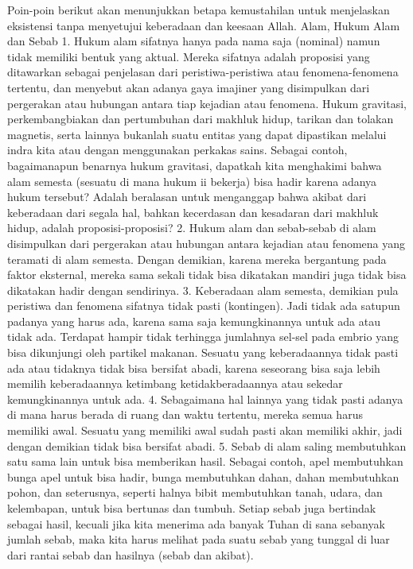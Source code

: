 \documentclass[]{article}
\begin{document}
Poin-poin berikut akan menunjukkan betapa kemustahilan untuk menjelaskan eksistensi tanpa menyetujui keberadaan dan keesaan Allah. 
Alam, Hukum Alam dan Sebab 
1. Hukum alam sifatnya hanya pada nama saja (nominal) namun tidak memiliki bentuk yang aktual. Mereka sifatnya adalah proposisi yang ditawarkan sebagai penjelasan dari peristiwa-peristiwa atau fenomena-fenomena tertentu,  dan menyebut akan adanya gaya imajiner yang disimpulkan dari pergerakan atau hubungan antara tiap kejadian atau fenomena. Hukum gravitasi, perkembangbiakan dan pertumbuhan dari makhluk hidup, tarikan dan tolakan magnetis, serta lainnya bukanlah suatu entitas yang dapat dipastikan melalui indra kita atau dengan menggunakan perkakas sains.  Sebagai contoh, bagaimanapun benarnya hukum gravitasi, dapatkah kita menghakimi bahwa alam semesta (sesuatu di mana hukum ii bekerja) bisa hadir karena adanya hukum tersebut? Adalah beralasan untuk menganggap bahwa akibat dari  keberadaan dari segala hal, bahkan kecerdasan dan kesadaran dari makhluk hidup, adalah proposisi-proposisi?
2.  Hukum alam dan sebab-sebab di alam disimpulkan dari pergerakan atau hubungan antara kejadian atau fenomena yang teramati di alam semesta. Dengan demikian, karena mereka bergantung pada faktor eksternal, mereka sama sekali tidak bisa dikatakan mandiri juga tidak bisa dikatakan hadir dengan sendirinya.
3.  Keberadaan alam semesta, demikian pula peristiwa dan fenomena sifatnya tidak pasti (kontingen). Jadi tidak ada satupun padanya yang harus ada,  karena sama saja kemungkinannya  untuk ada atau tidak ada. Terdapat hampir tidak terhingga jumlahnya sel-sel pada embrio yang bisa dikunjungi oleh partikel makanan. Sesuatu yang keberadaannya tidak pasti ada atau tidaknya tidak bisa bersifat abadi, karena seseorang bisa saja lebih memilih keberadaannya ketimbang ketidakberadaannya atau sekedar kemungkinannya untuk ada.
4. Sebagaimana hal lainnya yang tidak pasti adanya di mana harus berada di ruang dan waktu tertentu, mereka semua harus memiliki awal. Sesuatu yang memiliki awal sudah pasti akan memiliki akhir, jadi dengan demikian tidak bisa bersifat abadi.
5. Sebab di alam saling membutuhkan satu sama lain untuk bisa memberikan hasil. Sebagai contoh, apel membutuhkan  bunga apel untuk bisa hadir, bunga membutuhkan dahan, dahan membutuhkan pohon, dan seterusnya, seperti halnya bibit membutuhkan tanah, udara, dan kelembapan, untuk bisa bertunas dan tumbuh. Setiap sebab juga bertindak sebagai hasil, kecuali jika kita menerima ada banyak Tuhan di sana sebanyak jumlah sebab, maka kita harus melihat pada suatu sebab yang tunggal di luar dari rantai sebab dan hasilnya (sebab dan akibat).
\end{document}
